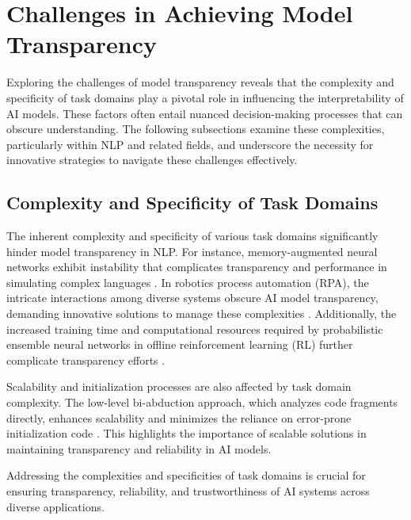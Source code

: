 








\section{Challenges in Achieving Model Transparency} \label{sec:Challenges in Achieving Model Transparency}

Exploring the challenges of model transparency reveals that the complexity and specificity of task domains play a pivotal role in influencing the interpretability of AI models. These factors often entail nuanced decision-making processes that can obscure understanding. The following subsections examine these complexities, particularly within NLP and related fields, and underscore the necessity for innovative strategies to navigate these challenges effectively.

\subsection{Complexity and Specificity of Task Domains} \label{subsec:Complexity and Specificity of Task Domains}

The inherent complexity and specificity of various task domains significantly hinder model transparency in NLP. For instance, memory-augmented neural networks exhibit instability that complicates transparency and performance in simulating complex languages \cite{stogin2022provablystableneuralnetwork}. In robotics process automation (RPA), the intricate interactions among diverse systems obscure AI model transparency, demanding innovative solutions to manage these complexities \cite{pandy2024advancementsroboticsprocessautomation}. Additionally, the increased training time and computational resources required by probabilistic ensemble neural networks in offline reinforcement learning (RL) further complicate transparency efforts \cite{wang2023environmenttransformerpolicyoptimization}.

Scalability and initialization processes are also affected by task domain complexity. The low-level bi-abduction approach, which analyzes code fragments directly, enhances scalability and minimizes the reliance on error-prone initialization code \cite{holk2022lowlevelbiabduction}. This highlights the importance of scalable solutions in maintaining transparency and reliability in AI models.

Addressing the complexities and specificities of task domains is crucial for ensuring transparency, reliability, and trustworthiness of AI systems across diverse applications.

